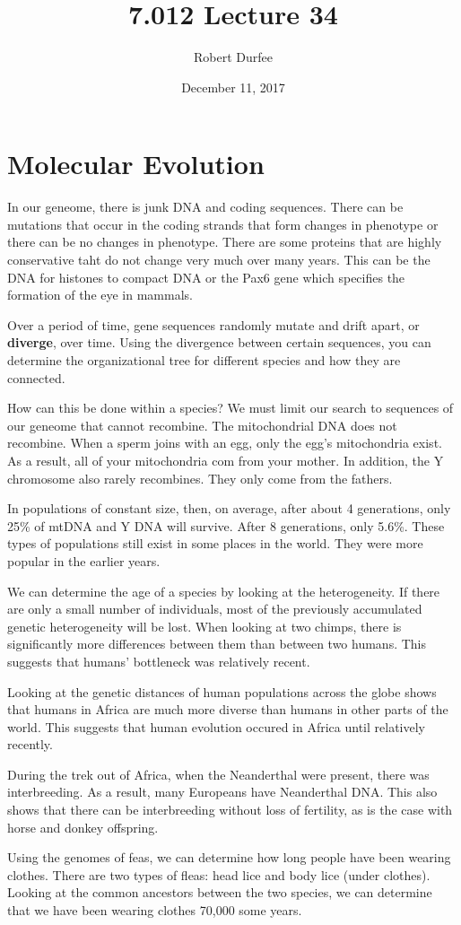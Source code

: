 \documentclass{article}
\title{ 7.012 Lecture 34 }
\author{ Robert Durfee }
\date{ December 11, 2017 }
\begin{document}
\maketitle

\section{ Molecular Evolution }

In our geneome, there is junk DNA and coding sequences. There can be mutations
that occur in the coding strands that form changes in phenotype or there can be
no changes in phenotype. There are some proteins that are highly conservative
taht do not change very much over many years. This can be the DNA for histones
to compact DNA or the Pax6 gene which specifies the formation of the eye in
mammals. 

Over a period of time, gene sequences randomly mutate and drift apart, or
\textbf{diverge}, over time. Using the divergence between certain sequences, you
can determine the organizational tree for different species and how they are
connected. 

How can this be done within a species? We must limit our search to sequences of
our geneome that cannot recombine. The mitochondrial DNA does not recombine.
When a sperm joins with an egg, only the egg's mitochondria exist. As a result,
all of your mitochondria com from your mother. In addition, the Y chromosome
also rarely recombines. They only come from the fathers. 

In populations of constant size, then, on average, after about 4 generations,
only 25\% of mtDNA and Y DNA will survive. After 8 generations, only 5.6\%.
These types of populations still exist in some places in the world. They were
more popular in the earlier years. 

We can determine the age of a species by looking at the heterogeneity. If there
are only a small number of individuals, most of the previously accumulated
genetic heterogeneity will be lost. When looking at two chimps, there is
significantly more differences between them than between two humans. This
suggests that humans' bottleneck was relatively recent. 

Looking at the genetic distances of human populations across the globe shows
that humans in Africa are much more diverse than humans in other parts of the
world. This suggests that human evolution occured in Africa until relatively
recently. 

During the trek out of Africa, when the Neanderthal were present, there was
interbreeding. As a result, many Europeans have Neanderthal DNA. This also shows
that there can be interbreeding without loss of fertility, as is the case with
horse and donkey offspring. 

Using the genomes of feas, we can determine how long people have been wearing
clothes. There are two types of fleas: head lice and body lice (under clothes).
Looking at the common ancestors between the two species, we can determine that
we have been wearing clothes 70,000 some years.
\end{document}
